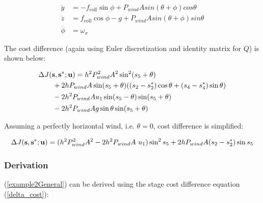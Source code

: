 \begin{align}
\ddot{y} &= -f_{\mathrm{coll}} \sin\phi \label{yddot} + P_{wind} A sin(\theta + \phi) cos \theta \\
\ddot{z} &=  f_{\mathrm{coll}} \cos\phi - g \label{zddot} + P_{wind} A sin(\theta + \phi) sin \theta \\
\dot{\phi} &= \omega_{x} \label{phidot}
\end{align}

The cost difference (again using Euler discretization and identity matrix for $Q$) is shown below:

\begin{equation}
\begin{aligned}
& \Delta J(\mathbf{s},\mathbf{s}^{*};\mathbf{u}) = h^{2}P_{wind}^{2}A^{2} \sin^{2}(s_{5} + \theta)  \\
& \hspace*{2em} + 2hP_{wind}A\sin(s_{5} + \theta)((s_{2} - s^{*}_{2})\cos\theta + (s_{4} - s^{*}_{4})\sin\theta)  \\
& \hspace*{2em} - 2h^{2}P_{wind}Au_{1}\sin(s_{5} - \theta)\sin(s_{5} + \theta) \\
& \hspace*{2em} - 2h^{2}P_{wind}Ag\sin\theta\sin(s_{5} + \theta) 
\end{aligned}
\label{example2General}
\end{equation}

Assuming a perfectly horizontal wind, i.e. $\theta = 0$, cost difference is simplified:

\begin{align}
\Delta J(\mathbf{s},\mathbf{s}^{\mathrm{*}};\mathbf{u}) = (h^{2}P_{wind}^{2}A^{2} - 2h^{2}P_{wind}A\ u_{1}) \sin^{2} s_{5} + 2hP_{wind}A(s_{2} - s^{*}_{2})\sin s_{5} \label{QuadTheta0}
\end{align}
%

\subsubsection*{Derivation}
(\ref{example2General}) can be derived using the stage cost difference equation (\ref{delta_cost}):


